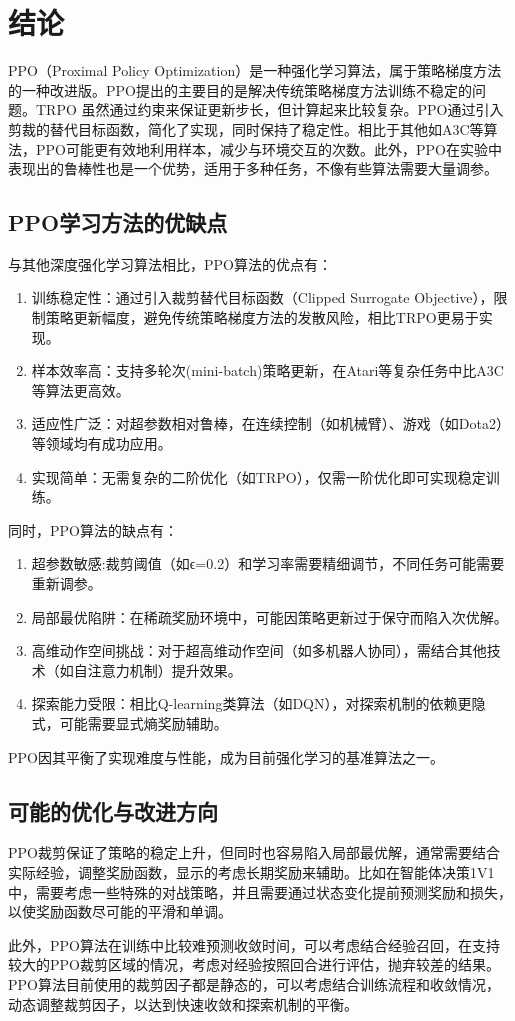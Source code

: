 \section{结论}
PPO（Proximal Policy Optimization）是一种强化学习算法，属于策略梯度方法的一种改进版。PPO提出的主要目的是解决传统策略梯度方法训练不稳定的问题。TRPO 虽然通过约束来保证更新步长，但计算起来比较复杂。PPO通过引入剪裁的替代目标函数，简化了实现，同时保持了稳定性。相比于其他如A3C等算法，PPO可能更有效地利用样本，减少与环境交互的次数。此外，PPO在实验中表现出的鲁棒性也是一个优势，适用于多种任务，不像有些算法需要大量调参。
\subsection{PPO学习方法的优缺点}

与其他深度强化学习算法相比，PPO算法的优点有：

\begin{enumerate}
    \item 训练稳定性：通过引入裁剪替代目标函数（Clipped Surrogate Objective），限制策略更新幅度，避免传统策略梯度方法的发散风险，相比TRPO更易于实现。
    \item 样本效率高：支持多轮次(mini-batch)策略更新，在Atari等复杂任务中比A3C等算法更高效。
    \item 适应性广泛：对超参数相对鲁棒，在连续控制（如机械臂）、游戏（如Dota2）等领域均有成功应用。
    \item 实现简单：无需复杂的二阶优化（如TRPO），仅需一阶优化即可实现稳定训练。
\end{enumerate}

同时，PPO算法的缺点有：

\begin{enumerate}
    \item 超参数敏感:裁剪阈值（如ϵ=0.2）和学习率需要精细调节，不同任务可能需要重新调参。
    \item 局部最优陷阱：在稀疏奖励环境中，可能因策略更新过于保守而陷入次优解。
    \item 高维动作空间挑战：对于超高维动作空间（如多机器人协同），需结合其他技术（如自注意力机制）提升效果。
    \item 探索能力受限：相比Q-learning类算法（如DQN），对探索机制的依赖更隐式，可能需要显式熵奖励辅助。
\end{enumerate}

PPO因其平衡了实现难度与性能，成为目前强化学习的基准算法之一。

\subsection{可能的优化与改进方向}
PPO裁剪保证了策略的稳定上升，但同时也容易陷入局部最优解，通常需要结合实际经验，调整奖励函数，显示的考虑长期奖励来辅助。比如在智能体决策1V1中，需要考虑一些特殊的对战策略，并且需要通过状态变化提前预测奖励和损失，以使奖励函数尽可能的平滑和单调。


此外，PPO算法在训练中比较难预测收敛时间，可以考虑结合经验召回，在支持较大的PPO裁剪区域的情况，考虑对经验按照回合进行评估，抛弃较差的结果。PPO算法目前使用的裁剪因子都是静态的，可以考虑结合训练流程和收敛情况，动态调整裁剪因子，以达到快速收敛和探索机制的平衡。